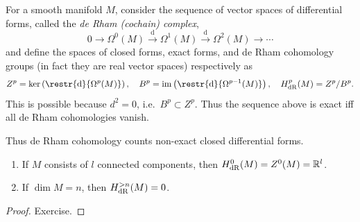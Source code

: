 \documentclass[english,letterpaper]{article}%
\numberwithin{equation}{section}
\numberwithin{figure}{section}
\numberwithin{table}{section}
\theoremstyle{definition}
\theoremstyle{definition}
\theoremstyle{definition}
\theoremstyle{plain}
\theoremstyle{plain}
\theoremstyle{plain}
\theoremstyle{plain}
\theoremstyle{remark}
\theoremstyle{remark}
\newcommand{\bbR}{\mathbb{R}}
\newcommand{\dd}{{\mathrm{d}}}
\DeclareMathOperator{\im}{im}
\begin{document}
\begin{defn}
    For a smooth manifold $M$, consider the sequence of vector spaces of differential forms, called the \emph{de Rham (cochain) complex},
    \[0\to\Omega^0(M)\overset\dd\to\Omega^1(M)\overset\dd\to\Omega^2(M)\to\cdots\]
    and define the spaces of closed forms, exact forms, and de Rham cohomology groups (in fact they are real vector spaces) respectively as
    \[Z^p=\ker\left(\restr{\dd}{\Omega^p(M)}\right),\quad B^p=\im\left(\restr{\dd}{\Omega^{p-1}(M)}\right),\quad H_{\rm dR}^p(M)=Z^p/B^p.\]
    This is possible because $d^2=0$, i.e.\ $B^p\subset Z^p$.
    Thus the sequence above is exact iff all de Rham cohomologies vanish.
\end{defn}
Thus de Rham cohomology counts non-exact closed differential forms.

\begin{prop}\label{prop zeroth cohomology}
    \begin{enumerate}
    \item If $M$ consists of $l$ connected components, then $H_{\rm dR}^0(M)=Z^0(M)=\bbR^l$.
    \item If $\dim M=n$, then $H_{\rm dR}^{> n}(M)=0$.
\end{enumerate}
\end{prop}
\begin{proof}
    Exercise.
\end{proof}
\end{document}
